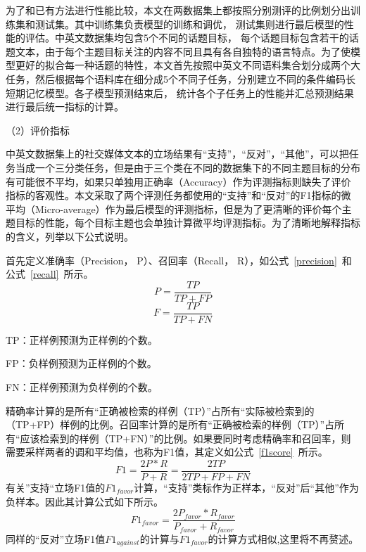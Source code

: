 为了和已有方法进行性能比较，本文在两数据集上都按照分别测评的比例划分出训练集和测试集。其中训练集负责模型的训练和调优， 测试集则进行最后模型的性能的评估。中英文数据集均包含5个不同的话题目标， 每个话题目标包含若干的话题文本，由于每个主题目标关注的内容不同且具有各自独特的语言特点。为了使模型更好的拟合每一种话题的特性，本文首先按照中英文不同语料集合划分成两个大任务，然后根据每个语料库在细分成5个不同子任务，分别建立不同的条件编码长短期记忆模型。各子模型预测结束后， 统计各个子任务上的性能并汇总预测结果进行最后统一指标的计算。

（2）评价指标

中英文数据集上的社交媒体文本的立场结果有“支持”，“反对”，“其他”，可以把任务当成一个三分类任务，但是由于三个类在不同的数据集下的不同主题目标的分布有可能很不平均，如果只单独用正确率（Accuracy）作为评测指标则缺失了评价指标的客观性。本文采取了两个评测任务都使用的“支持”和“反对”的F1指标的微平均（Micro-average）作为最后模型的评测指标，但是为了更清晰的评价每个主题目标的性能，每个目标主题也会单独计算微平均评测指标。为了清晰地解释指标的含义，列举以下公式说明。

首先定义准确率（Precision， P）、召回率（Recall， R），如公式~\ref{precision}~和公式~\ref{recall}~所示。
\begin{equation}\label{precision}P=\frac{TP}{TP+FP}\end{equation}
\begin{equation}\label{recall}F=\frac{TP}{TP+FN}\end{equation}

TP：正样例预测为正样例的个数。

FP：负样例预测为正样例的个数。

FN：正样例预测为负样例的个数。

精确率计算的是所有“正确被检索的样例（TP）”占所有“实际被检索到的（TP+FP）样例的比例。召回率计算的是所有“正确被检索的样例（TP）”占所有“应该检索到的样例（TP+FN）”的比例。如果要同时考虑精确率和召回率，则需要采样两者的调和平均值，也称为F1值，其定义如公式~\ref{f1score}~所示。
\begin{equation}\label{f1score}F1=\frac{2P*R}{P+R}=\frac{2TP}{2TP+FP+FN}\end{equation}
有关”支持“立场F1值的$F1_{favor}$计算，“支持”类标作为正样本，“反对”后“其他”作为负样本。因此其计算公式如下所示。
\begin{equation}\label{f1favor}F1_{favor}=\frac{2P_{favor}*R_{favor}}{P_{favor}+R_{favor}}\end{equation}
同样的“反对”立场F1值$F1_{against}$的计算与$F1_{favor}$的计算方式相似,这里将不再赘述。

